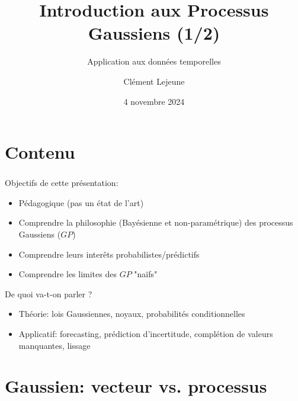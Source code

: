 \documentclass[xcolor=svgnames, t]{beamer}
\title[Introduction aux Processus Gaussiens]{Introduction aux Processus Gaussiens (1/2)}
\subtitle{Application aux données temporelles}
\author[Cl\'ement Lejeune]{Cl\'ement Lejeune}
\institute[smwhe]{
company,
\\ dept
}
\date{4 novembre 2024}
\begin{document}
\frame{\titlepage}

\section{Contenu}
\begin{frame}\frametitle{\secname}
  Objectifs de cette présentation:
  \begin{itemize}
    \item Pédagogique (pas un état de l'art)
    \pause
    \item Comprendre la philosophie (Bayésienne et non-paramétrique) des processus Gaussiens ($GP$)
    \pause
    \item Comprendre leurs interêts probabilistes/prédictifs
    \pause
    \item Comprendre les limites des $GP$ "naïfs"
  \end{itemize}
  De quoi va-t-on parler ?
  \begin{itemize}
    \item Théorie: lois Gaussiennes, noyaux, probabilités conditionnelles
    \pause
    \item Applicatif: forecasting, prédiction d'incertitude, complétion de valeurs manquantes, lissage
  \end{itemize}
\end{frame}

\AtBeginSubsection[]
{
  \begin{frame}\frametitle{\secname}
    \tableofcontents[currentsubsection]
  \end{frame}
}

\section{Gaussien: vecteur vs. processus}
\end{document}
